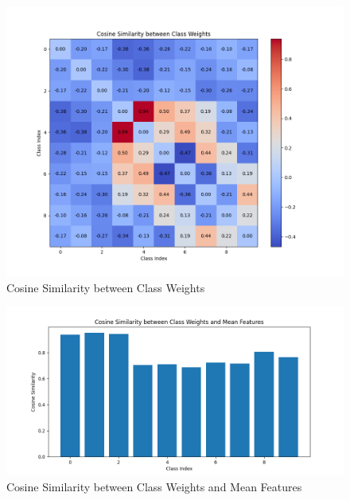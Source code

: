 \documentclass{article}
\begin{document}
\begin{multicols}{2}
\columnbreak
\begin{figure}[H]
\centering
\includegraphics[width=\linewidth]{Plot/CE/stage--2/cos_VS_5000_50_epoch_199.png}
\caption{Cosine Similarity between Class Weights}
\end{figure}
\begin{figure}[H]
\centering
\includegraphics[width=\linewidth]{Plot/CE/stage--2/Wi_Hi_cos_VS_5000_50_epoch_199.png}
\caption{Cosine Similarity between Class Weights and Mean Features}
\end{figure}

\end{multicols} %


\newpage
\end{document}
